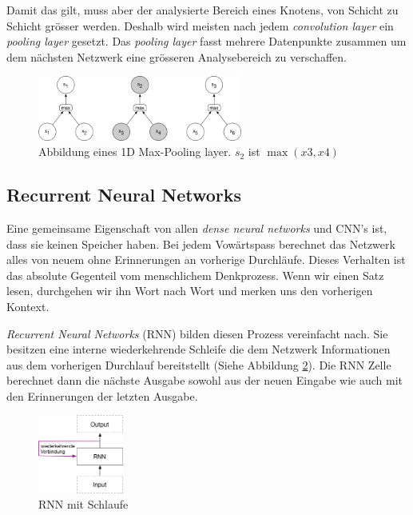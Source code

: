 Damit das gilt, muss aber der analysierte Bereich eines Knotens, von Schicht zu Schicht grösser werden. Deshalb wird meisten nach jedem \textit{convolution layer} ein \textit{pooling layer} gesetzt. Das \textit{pooling layer} fasst mehrere Datenpunkte zusammen um dem nächsten Netzwerk eine grösseren Analysebereich zu verschaffen.
\begin{figure}[hbt]
	\centering
		\includegraphics[width=0.6\textwidth]{assets/pooling_1d.png}
	\caption{Abbildung eines 1D Max-Pooling layer. $s_2$ ist $\max (x3, x4)$}
	\label{img:pool}
\end{figure}


\subsection{Recurrent Neural Networks}
Eine gemeinsame Eigenschaft von allen \textit{dense neural networks} und CNN's ist, dass sie keinen Speicher haben. Bei jedem Vowärtspass berechnet das Netzwerk alles von neuem ohne Erinnerungen an vorherige Durchläufe. Dieses Verhalten ist das absolute Gegenteil vom menschlichem Denkprozess. Wenn wir einen Satz lesen, durchgehen wir ihn Wort nach Wort und merken uns den vorherigen Kontext.

\textit{Recurrent Neural Networks} (RNN) bilden diesen Prozess vereinfacht nach. Sie besitzen eine interne wiederkehrende Schleife die dem Netzwerk Informationen aus dem vorherigen Durchlauf bereitstellt (Siehe Abbildung \ref{img:rnn_loop}). Die RNN Zelle berechnet dann die nächste Ausgabe sowohl aus der neuen Eingabe wie auch mit den Erinnerungen der letzten Ausgabe. \parencite{chollet}\\
\begin{figure}[hbt]
	\centering
		\includegraphics[width=0.25\textwidth]{assets/rnn_loop.png}
	\caption{RNN mit Schlaufe}
	\label{img:rnn_loop}
\end{figure}

